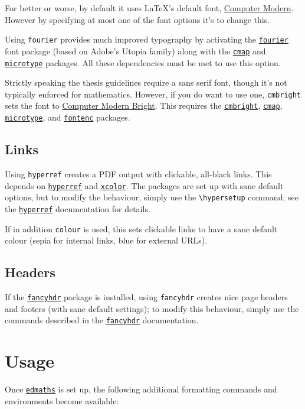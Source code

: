 \documentclass[12pt]{article}
\newcommand\pkg[1]{\href{https://www.ctan.org/pkg/#1}{\color{teal}\lstinline{#1}}}
\newcommand\key[1]{{\color{orange}\lstinline|#1|}}
\begin{document}
For better or worse, by default it uses \LaTeX's default font, \href{https://en.wikipedia.org/wiki/Computer_Modern}{Computer Modern}. However by specifying at most one of the font options it's to change this.

Using \key{fourier} provides much improved typography by activating the \pkg{fourier} font package (based on Adobe's Utopia family) along with the \pkg{cmap} and \pkg{microtype} packages. All these dependencies must be met to use this option.

Strictly speaking the thesis guidelines require a sans serif font, though it's not typically enforced for mathematics. However, if you do want to use one, \key{cmbright} sets the font to \href{https://tug.org/FontCatalogue/computermodernbright/}{Computer Modern Bright}. This requires the \pkg{cmbright}, \pkg{cmap}, \pkg{microtype}, and \pkg{fontenc} packages.

\subsection{Links}

Using \key{hyperref} creates a PDF output with clickable, all-black links. This depends on \pkg{hyperref} and \pkg{xcolor}. The packages are set up with sane default options, but to modify the behaviour, simply use the \lstinline|\hypersetup| command; see the \pkg{hyperref} documentation for details.

If in addition \key{colour} is used, this sets clickable links to have a sane default colour (sepia for internal links, blue for external URLs).

\subsection{Headers}

If the \pkg{fancyhdr} package is installed, using \key{fancyhdr} creates nice page headers and footers (with sane default settings); to modify this behaviour, simply use the commands described in the \pkg{fancyhdr} documentation.

\section{Usage}

Once \pkg{edmaths} is set up, the following additional formatting commands and environments become available:
\end{document}
